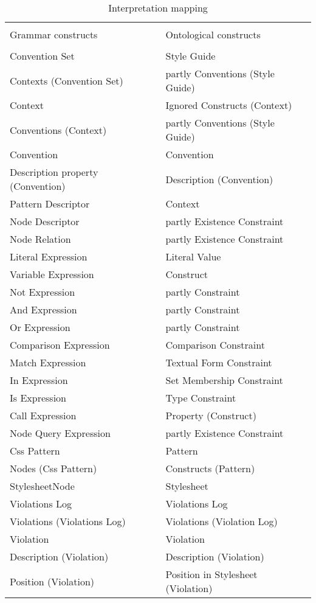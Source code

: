 \begin{table}[t]
\begin{center}
\begin{longtable}{ | p{20em} | p{20em} | } 
\hline
 &  \\
Grammar constructs & Ontological constructs  \\
 &  \\
\hline

Convention Set & Style Guide \\ \hline
Contexts (Convention Set) & partly Conventions (Style Guide) \\ \hline
Context & Ignored Constructs (Context) \\ \hline
Conventions (Context) & partly Conventions (Style Guide) \\ \hline
Convention & Convention \\ \hline
Description property (Convention) & Description (Convention) \\ \hline
Pattern Descriptor & Context \\ \hline
Node Descriptor & partly Existence Constraint \\ \hline
Node Relation & partly Existence Constraint \\ \hline

Literal Expression & Literal Value \\ \hline
Variable Expression & Construct \\ \hline
Not Expression & partly Constraint \\ \hline
And Expression & partly Constraint \\ \hline
Or Expression & partly Constraint \\ \hline
Comparison Expression & Comparison Constraint \\ \hline
Match Expression & Textual Form Constraint \\ \hline
In Expression & Set Membership Constraint \\ \hline
Is Expression & Type Constraint \\ \hline
Call Expression & Property (Construct) \\ \hline
Node Query Expression & partly Existence Constraint \\ \hline

Css Pattern & Pattern \\ \hline
Nodes (Css Pattern) & Constructs (Pattern) \\ \hline
StylesheetNode & Stylesheet \\ \hline
Violations Log & Violations Log \\ \hline
Violations (Violations Log) & Violations (Violation Log) \\ \hline
Violation & Violation \\ \hline
Description (Violation) & Description (Violation) \\ \hline
Position (Violation) & Position in Stylesheet (Violation) \\ \hline
\end{longtable}
\end{center}
\caption{
	\label{tab:interpretation}
	Interpretation mapping}
\end{table}
